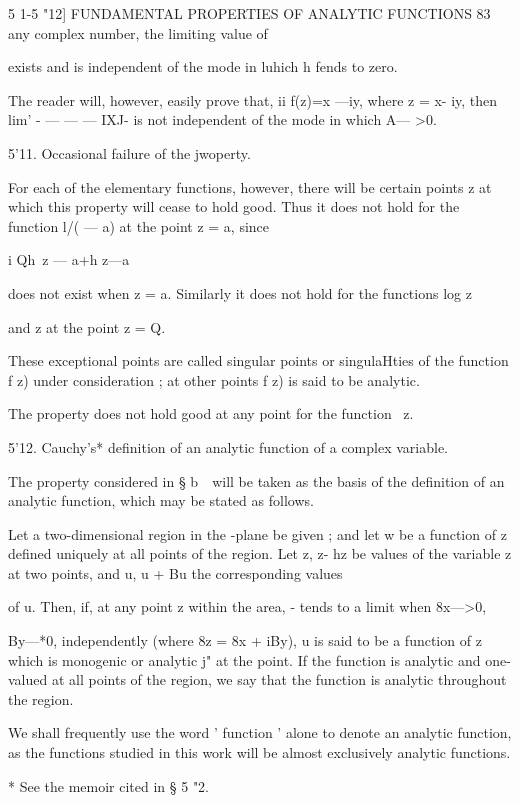 5 1-5 "12] FUNDAMENTAL PROPERTIES OF ANALYTIC FUNCTIONS 83 
any complex number, the limiting value of 

exists and is independent of the mode in luhich h fends to zero. 

The reader will, however, easily prove that, ii f(z)=x —iy, where z = x-  iy, 
then lim' -   — —   — IXJ- is not independent of the mode in which A— >0. 

5'11. Occasional failure of the jwoperty. 

For each of the elementary functions, however, there will be certain points 
z at which this property will cease to hold good. Thus it does not hold for 
the function l/(  — a) at the point z = a, since 

 i Qh\ z — a+h z—a 

does not exist when z = a. Similarly it does not hold for the functions log z 

and z  at the point z = Q. 

These exceptional points are called singular points or singulaHties of the 
function f z) under consideration ; at other points f z) is said to be analytic. 

The property does not hold good at any point for the function \ z.  

5'12. Cauchy's* definition of an analytic function of a complex variable. 

The property considered in § b\ \  will be taken as the basis of the 
definition of an analytic function, which may be stated as follows. 

Let a two-dimensional region in the  -plane be given ; and let w be a 
function of z defined uniquely at all points of the region. Let z, z- hz be 
values of the variable z at two points, and u, u + Bu the corresponding values 

of u. Then, if, at any point z within the area, -  tends to a limit when 8x—>0, 

By—*0, independently (where 8z = 8x + iBy), u is said to be a function of z  
which is monogenic or analytic j" at the point. If the function is analytic and 
one-valued at all points of the region, we say that the function is analytic 
throughout the region.  

We shall frequently use the word ' function ' alone to denote an analytic 
function, as the functions studied in this work will be almost exclusively 
analytic functions. 

* See the memoir cited in § 5 "2. 

